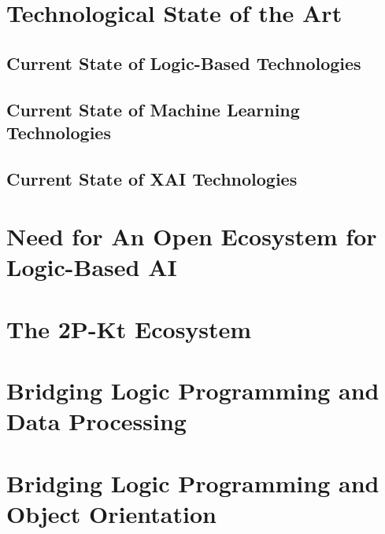\documentclass[12pt,a4paper,openright,twoside]{book}
\begin{document}
\chapter{Technological State of the Art}

\cite{coordination-jlamp2020}

\section{Current State of Logic-Based Technologies}

\cite{lptech4mas-aamas2021}
\cite{lptech4mas-jaamas35}
\cite{logictech-information11}

\section{Current State of Machine Learning Technologies}

\section{Current State of XAI Technologies}

\cite{xaisurvey-ia14}

\chapter{Need for An Open Ecosystem for Logic-Based AI}

\cite{cco-softwarex-2021-2pkt}

\chapter{The 2P-Kt Ecosystem}

\cite{cco-softwarex-2021-2pkt}
\cite{kotlindsi4prolog-woa2020}

\chapter{Bridging Logic Programming and Data Processing}

\cite{2pkt-jelia2021}

\chapter{Bridging Logic Programming and Object Orientation}

\cite{cco-softwarex-2021-2pkt}
\cite{kotlindsi4prolog-woa2020}
\end{document}
